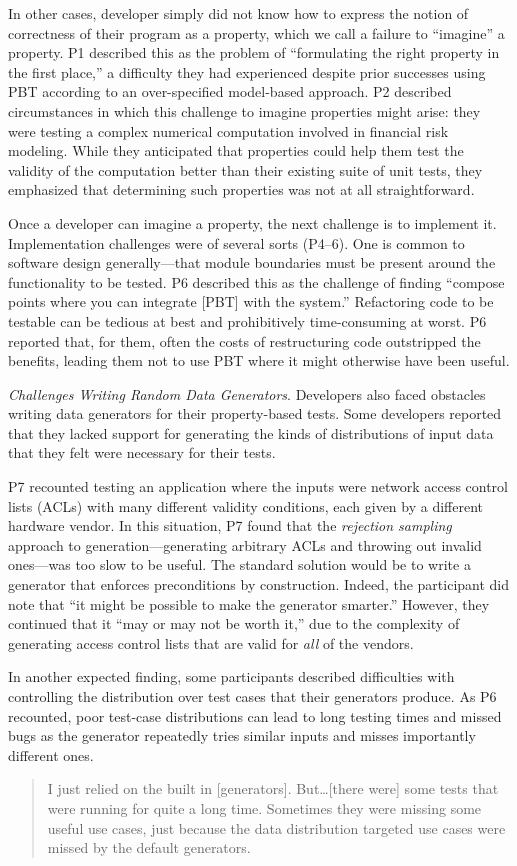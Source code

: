 In other cases, developer simply did not know how to express the notion of
correctness of their program as a property, which we call a failure
to ``imagine'' a property.
P1 described this as the problem of ``formulating the right property in the first place,''
a difficulty they had experienced despite prior successes using PBT according to
an over-specified model-based approach. P2 described circumstances in which this
challenge to imagine properties might arise: they were testing a complex numerical
computation involved in financial risk modeling. While they anticipated that
properties could help them test the validity of the computation better than their
existing suite of unit tests, they emphasized that determining such properties
was not at all straightforward.

Once a developer can imagine a property, the next challenge is to implement it.
Implementation challenges were of several sorts (P4--6). One
is common to software design generally---that module boundaries must be present
around the functionality to be tested. P6 described this as the challenge of
finding ``compose points where you can integrate [PBT] with the system.'' Refactoring
code to be testable can be tedious at best and prohibitively time-consuming at
worst. P6 reported that, for them, often the costs of restructuring code outstripped the benefits,
leading them not to use PBT where it might otherwise have been useful.

\textit{Challenges Writing Random Data Generators}.
Developers also faced obstacles writing data generators for their property-based
tests.
Some developers reported that they lacked support for generating the kinds of
distributions of input data that they felt were necessary for their tests.

P7 recounted testing an application where the inputs were network access control lists (ACLs)
with many different validity conditions, each given by
a different hardware vendor.
In this situation, P7 found that the {\em rejection sampling} approach to generation---generating
arbitrary ACLs and throwing out invalid ones---was too slow to be useful.
The standard solution would be to write a generator that enforces preconditions
by construction. Indeed, the participant did note that ``it might be possible to
make the generator smarter.'' However, they continued that it ``may or may not be worth it,'' due to
the complexity of generating access control lists that are valid for \emph{all}
of the vendors.

In another expected finding, some participants described difficulties with
controlling the distribution over test cases that their generators produce.
As P6 recounted, poor test-case distributions can lead to long testing times and missed bugs
as the generator repeatedly tries similar inputs and misses importantly different ones.
\begin{quote}
  I just relied on the built in [generators]. But\dots [there were] some tests
  that were running for quite a long time. Sometimes they were missing some
  useful use cases, just because the data distribution targeted use cases were
  missed by the default generators.
\end{quote}

